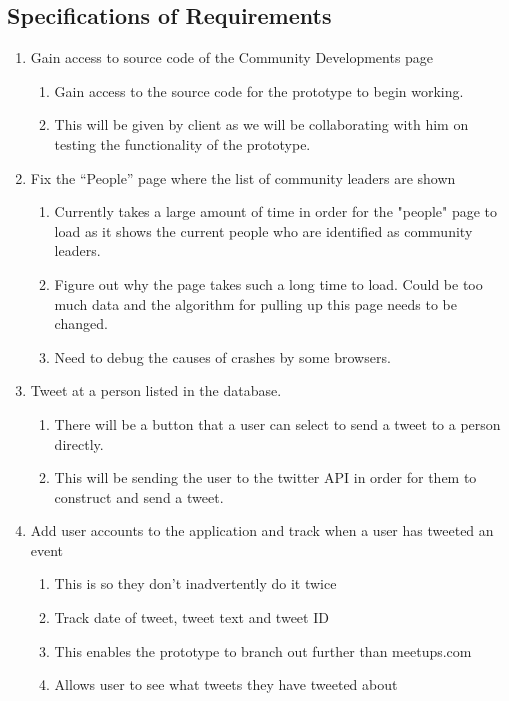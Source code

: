 \documentclass[draftclsnofoot,10pt,onecolumn]{IEEEtran} %
\begin{document}
\subsection{Specifications of Requirements}
\begin{enumerate}
\item Gain access to source code of the Community Developments page

\begin{enumerate}
\item Gain access to the source code for the prototype to begin working.
\item This will be given by client as we will be collaborating with him on testing the functionality of the prototype.
\end{enumerate}

\item Fix the “People” page where the list of community leaders are shown
\begin{enumerate}
\item Currently takes a large amount of time in order for the "people" page to load as it shows the current people who are identified as community leaders.
\item Figure out why the page takes such a long time to load. Could be too much data and the algorithm for pulling up this page needs to be changed.
\item Need to debug the causes of crashes by some browsers.
\end{enumerate}

\item Tweet at a person listed in the database.
\begin{enumerate}
\item There will be a button that a user can select to send a tweet to a person directly.
\item This will be sending the user to the twitter API in order for them to construct and send a tweet.
\end{enumerate}

\item Add user accounts to the application and track when a user has tweeted an event
\begin{enumerate}
\item This is so they don't inadvertently do it twice
\item Track date of tweet, tweet text and tweet ID
\item This enables the prototype to branch out further than meetups.com
\item Allows user to see what tweets they have tweeted about
\end{enumerate}


\end{enumerate}
\end{document}
